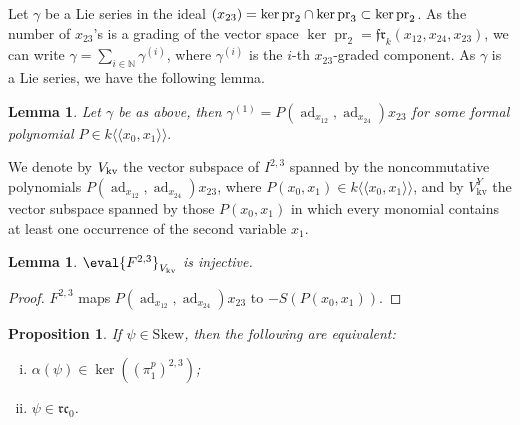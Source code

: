 \documentclass[a4paper,fleqn]{cas-sc}
\newtheorem{lemma}[theorem]{Lemma}
\newtheorem{proposition}[theorem]{Proposition}
\DeclareMathOperator{\pr}{pr}
\newcommand{\N}{\mathbb{N}}
\DeclareMathOperator{\ad}{ad}
\DeclareMathOperator{\kv}{kv}
\begin{document}
Let $\gamma$ be a Lie series in the ideal $(x_{23})=\ker \rm{pr}_2\cap \ker \rm{pr}_3\subset \ker \rm{pr}_2$. As the number of $x_{23}$'s is a grading of the vector space $\ker \pr_2=\mathfrak{fr}_k(x_{12},x_{24},x_{23})$, we can write $\gamma=\sum_{i\in \N}\gamma^{(i)}$, where $\gamma^{(i)}$ is the $i$-th $x_{23}$-graded component. As $\gamma$ is a Lie series, we have the following lemma.

\begin{lemma}
\label{lemma:gamma-1-P}
Let $\gamma$ be as above, then
$
\gamma^{(1)}=P(\ad_{x_{12}},\ad_{x_{24}})x_{23}
$
for some formal polynomial $P\in k\langle \langle x_0,x_1\rangle\rangle.$
\end{lemma}


We denote by $V_{\rm{kv}}$ the vector subspace of $I^{2,3}$ spanned by the noncommutative polynomials $P(\ad_{x_{12}},\ad_{x_{24}})x_{23}$, where $P(x_0,x_1) \in k\langle \langle x_0,x_1 \rangle \rangle$, and
by $V_{\kv}^Y$ the vector subspace spanned by those $P(x_0,x_1)$ in which every monomial contains at least one occurrence of the second variable $x_1$.

\begin{lemma}\label{lemma:F_injective}
$\eval{F^{2,3}}_{V_{\rm{kv}}}$ is injective.
\end{lemma}
\begin{proof}
$F^{2,3}$ maps $P(\ad_{x_{12}},\ad_{x_{24}})x_{23}$ to $-S(P(x_0,x_1))$. %
\end{proof}

\begin{proposition}\label{prop:kernel and rc}
If $\psi\in \mathrm{Skew}$, then the following are equivalent:
\begin{enumerate}[(i)] %
    \item \label{prop:kernel and rc-1}
    $\alpha(\psi)\in \ker((\pi^{p}_1)^{2,3})$;
    \item  \label{prop:kernel and rc-2}
    $\psi\in \mathfrak{rc}_0$.
\end{enumerate}
\end{proposition}
\end{document}
